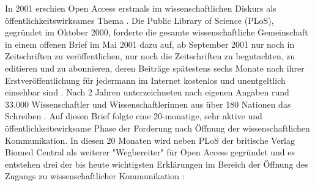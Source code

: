 In 2001 erschien Open Access erstmals im wissenschaftlichen Diskurs als öffentlichkeitswirksames Thema \cite{SCIENCE_Editors_2001} \cite{Roberts_2001}. Die Public Library of Science (PLoS), gegründet im Oktober 2000, forderte die gesamte wissenschaftliche Gemeinschaft in einem offenen Brief im Mai 2001 dazu auf, ab September 2001 nur noch in Zeitschriften zu veröffentlichen, nur noch die Zeitschriften zu begutachten, zu editieren und zu abonnieren, deren Beiträge spätestens sechs Monate nach ihrer Erstveröffentlichung für jedermann im Internet kostenlos und unentgeltlich einsehbar sind \cite{PLOS_2000}. Nach 2 Jahren unterzeichneten nach eigenen Angaben rund 33.000 Wissenschaftler und Wissenschaftlerinnen aus über 180 Nationen das Schreiben \cite{PLOS_2003}. Auf diesen Brief folgte eine 20-monatige, sehr aktive und öffentlichkeitswirksame Phase der Forderung nach Öffnung der wissenschaftlichen Kommunikation. In diesen 20 Monaten wird neben PLoS der britische Verlag Biomed Central als weiterer "Wegbereiter" für Open Access \cite[:8]{Hofmann_2015} gegründet und es entstehen drei der bis heute wichtigsten Erklärungen im Bereich der Öffnung des Zugangs zu wissenschaftlicher Kommunikation \cite{CREATe_2014}:
